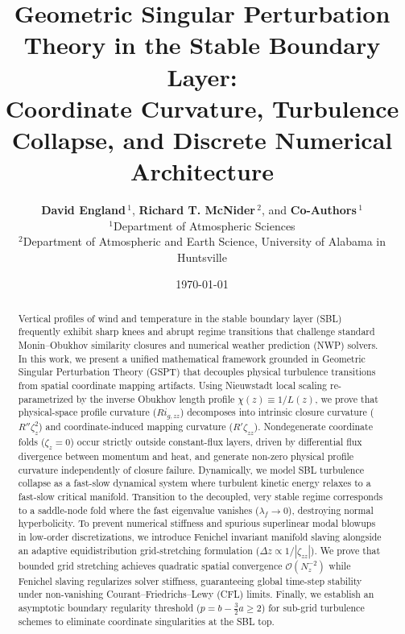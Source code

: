 \documentclass[draft,11pt]{article}
\title{\textbf{Geometric Singular Perturbation Theory in the Stable Boundary Layer:\\ Coordinate Curvature, Turbulence Collapse, and Discrete Numerical Architecture}}
\author{
  \textbf{David England}\,$^1$, \textbf{Richard T. McNider}\,$^2$, and \textbf{Co-Authors}\,$^1$\\[0.8em]
  $^1$Department of Atmospheric Sciences\\
  $^2$Department of Atmospheric and Earth Science, University of Alabama in Huntsville
}
\date{\today}
\theoremstyle{definition}
\theoremstyle{remark}
\begin{document}
\maketitle

\begin{abstract}
Vertical profiles of wind and temperature in the stable boundary layer (SBL) frequently exhibit sharp knees and abrupt regime transitions that challenge standard Monin--Obukhov similarity closures and numerical weather prediction (NWP) solvers. In this work, we present a unified mathematical framework grounded in Geometric Singular Perturbation Theory (GSPT) that decouples physical turbulence transitions from spatial coordinate mapping artifacts. Using Nieuwstadt local scaling re-parametrized by the inverse Obukhov length profile $\chi(z) \equiv 1/L(z)$, we prove that physical-space profile curvature ($Ri_{g,zz}$) decomposes into intrinsic closure curvature ($R''\zeta_z^2$) and coordinate-induced mapping curvature ($R'\zeta_{zz}$). Nondegenerate coordinate folds ($\zeta_z = 0$) occur strictly outside constant-flux layers, driven by differential flux divergence between momentum and heat, and generate non-zero physical profile curvature independently of closure failure. Dynamically, we model SBL turbulence collapse as a fast-slow dynamical system where turbulent kinetic energy relaxes to a fast-slow critical manifold. Transition to the decoupled, very stable regime corresponds to a saddle-node fold where the fast eigenvalue vanishes ($\lambda_f \to 0$), destroying normal hyperbolicity. To prevent numerical stiffness and spurious superlinear modal blowups in low-order discretizations, we introduce Fenichel invariant manifold slaving alongside an adaptive equidistribution grid-stretching formulation ($\Delta z \propto 1/|\zeta_{zz}|$). We prove that bounded grid stretching achieves quadratic spatial convergence $\mathcal{O}(N_z^{-2})$ while Fenichel slaving regularizes solver stiffness, guaranteeing global time-step stability under non-vanishing Courant--Friedrichs--Lewy (CFL) limits. Finally, we establish an asymptotic boundary regularity threshold ($p = b - \frac{3}{2}a \ge 2$) for sub-grid turbulence schemes to eliminate coordinate singularities at the SBL top.
\end{abstract}







\end{document}
